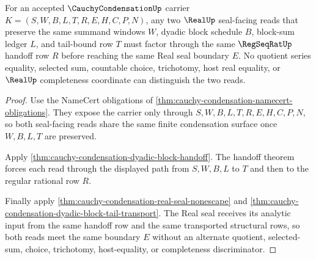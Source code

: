 \begin{theorem}
\label{thm:cauchy-condensation-tail-lock-uniqueness}
For an accepted $\CauchyCondensationUp$ carrier $K=(S,W,B,L,T,R,E,H,C,P,N)$, any two $\RealUp$ seal-facing reads that preserve the same summand windows $W$, dyadic block schedule $B$, block-sum ledger $L$, and tail-bound row $T$ must factor through the same $\RegSeqRatUp$ handoff row $R$ before reaching the same Real seal boundary $E$. No quotient series equality, selected sum, countable choice, trichotomy, host real equality, or $\RealUp$ completeness coordinate can distinguish the two reads.
\end{theorem}
\begin{proof}
Use the NameCert obligations of \autoref{thm:cauchy-condensation-namecert-obligations}. They expose the carrier only through $S,W,B,L,T,R,E,H,C,P,N$, so both seal-facing reads share the same finite condensation surface once $W,B,L,T$ are preserved.

Apply \autoref{thm:cauchy-condensation-dyadic-block-handoff}. The handoff theorem forces each read through the displayed path from $S,W,B,L$ to $T$ and then to the regular rational row $R$.

Finally apply \autoref{thm:cauchy-condensation-real-seal-nonescape} and \autoref{thm:cauchy-condensation-dyadic-block-tail-transport}. The Real seal receives its analytic input from the same handoff row and the same transported structural rows, so both reads meet the same boundary $E$ without an alternate quotient, selected-sum, choice, trichotomy, host-equality, or completeness discriminator.
\end{proof}

